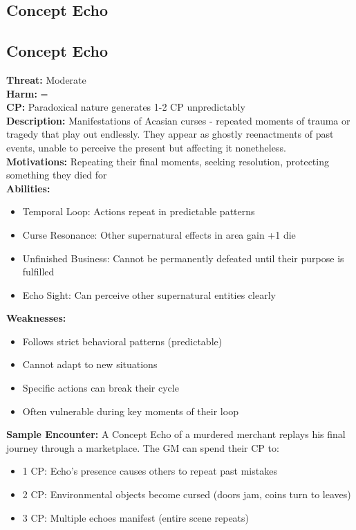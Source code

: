 \documentclass[11pt]{article}
\newenvironment{monsterentry}[1]{%
  \begin{mdframed}[backgroundcolor=shadecolor, linewidth=0pt, leftmargin=0pt, rightmargin=0pt]%
  \subsection*{#1}%
}{%
  \end{mdframed}%
}
\begin{document}
\subsection{Concept Echo}

\begin{monsterentry}{Concept Echo}
\textbf{Threat:} Moderate \\
\textbf{Harm:} = \\
\textbf{CP:} Paradoxical nature generates 1-2 CP unpredictably \\
\textbf{Description:} Manifestations of Acasian curses - repeated moments of trauma or tragedy that play out endlessly. They appear as ghostly reenactments of past events, unable to perceive the present but affecting it nonetheless. \\
\textbf{Motivations:} Repeating their final moments, seeking resolution, protecting something they died for \\
\textbf{Abilities:}
\begin{itemize}
    \item Temporal Loop: Actions repeat in predictable patterns
    \item Curse Resonance: Other supernatural effects in area gain +1 die
    \item Unfinished Business: Cannot be permanently defeated until their purpose is fulfilled
    \item Echo Sight: Can perceive other supernatural entities clearly
\end{itemize}
\textbf{Weaknesses:}
\begin{itemize}
    \item Follows strict behavioral patterns (predictable)
    \item Cannot adapt to new situations
    \item Specific actions can break their cycle
    \item Often vulnerable during key moments of their loop
\end{itemize}
\textbf{Sample Encounter:} A Concept Echo of a murdered merchant replays his final journey through a marketplace. The GM can spend their CP to:
\begin{itemize}
    \item 1 CP: Echo's presence causes others to repeat past mistakes
    \item 2 CP: Environmental objects become cursed (doors jam, coins turn to leaves)
    \item 3 CP: Multiple echoes manifest (entire scene repeats)
\end{itemize}
\end{monsterentry}
\end{document}
